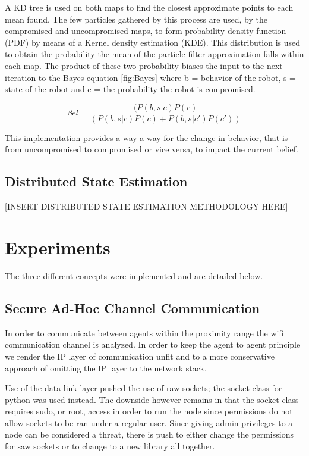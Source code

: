 \documentclass[conference]{IEEEtran}
\begin{document}
A KD tree is used on both maps to find the closest approximate points to each mean found. The few particles gathered by this process are used, by the compromised and uncompromised maps, to form probability density function (PDF) by means of a Kernel density estimation (KDE). This distribution is used to obtain the probability the mean of the particle filter approximation falls within each map. The product of these two probability biases the input to the next iteration to the Bayes equation \ref{fig:Bayes} where b = behavior of the robot, s = state of the robot and c = the probability the robot is compromised.

\begin{equation}
 \beta el =\frac {(P(b,s|c)P(c)} {(P(b,s|c)P(c) + 
 P(b,s|c' )P(c' ))} 
 \label{fig:Bayes}
\end{equation}

This implementation provides a way a way for the change in behavior, that is from uncompromised to compromised or vice versa, to impact the current belief.


\subsection{Distributed State Estimation}
[INSERT DISTRIBUTED STATE ESTIMATION METHODOLOGY HERE]

\section{Experiments}

The three different concepts were implemented and are detailed below.

\subsection{Secure Ad-Hoc Channel Communication}

In order to communicate between agents within the proximity range the wifi communication channel is analyzed. In order to keep the agent to agent principle we render the IP layer of communication unfit and to a more conservative approach of omitting the IP layer to the network stack.

Use of the data link layer pushed the use of raw sockets; the socket class for python was used instead. The downside however remains in that the socket class requires sudo, or root, access in order to run the node since permissions do not allow sockets to be ran under a regular user. Since giving admin privileges to a node can be considered a threat, there is push to either change the permissions for saw sockets or to change to a new library all together.
\end{document}
